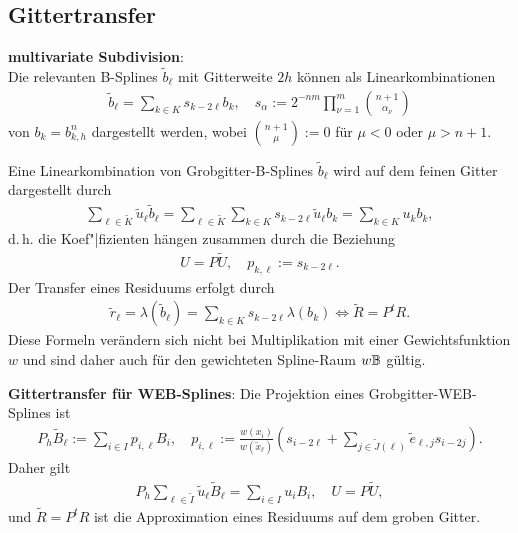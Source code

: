 \pagebreak

\subsection{%
    Gittertransfer%
}

\textbf{multivariate Subdivision}:\\
Die relevanten B-Splines $\widetilde{b}_\ell$ mit Gitterweite $2h$ können als Linearkombinationen
\begin{align*}
    \widetilde{b}_\ell = \sum_{k \in K} s_{k-2\ell} b_k,\quad
    s_\alpha := 2^{-nm} \prod_{\nu=1}^m \binom{n+1}{\alpha_\nu}
\end{align*}
von $b_k = b_{k,h}^n$ dargestellt werden,
wobei $\binom{n+1}{\mu} := 0$ für $\mu < 0$ oder $\mu > n + 1$.

Eine Linearkombination von Grobgitter-B-Splines $\widetilde{b}_\ell$ wird auf dem feinen Gitter
dargestellt durch
\begin{align*}
    \sum_{\ell \in \widetilde{K}} \widetilde{u}_\ell \widetilde{b}_\ell
    = \sum_{\ell \in \widetilde{K}} \sum_{k \in K} s_{k-2\ell} \widetilde{u}_\ell b_k
    = \sum_{k \in K} u_k b_k,
\end{align*}
d.\,h. die Koef"|fizienten hängen zusammen durch die Beziehung
\begin{align*}
    U = P \widetilde{U},\quad
    p_{k,\ell} := s_{k-2\ell}.
\end{align*}
Der Transfer eines Residuums erfolgt durch
\begin{align*}
    \widetilde{r}_\ell
    = \lambda(\widetilde{b}_\ell)
    = \sum_{k \in K} s_{k-2\ell} \lambda(b_k)
    \iff
    \widetilde{R} = P^t R.
\end{align*}
Diese Formeln verändern sich nicht bei Multiplikation mit einer Gewichtsfunktion $w$ und sind
daher auch für den gewichteten Spline-Raum $w\mathbb{B}$ gültig.

\linie

\textbf{Gittertransfer für WEB-Splines}:
Die Projektion eines Grobgitter-WEB-Splines ist
\begin{align*}
    P_h \widetilde{B}_\ell
    := \sum_{i \in I} p_{i,\ell} B_i,\quad
    p_{i,\ell} := \frac{w(x_i)}{w(\widetilde{x}_\ell)}
    \left(s_{i-2\ell} + \sum_{j \in \widetilde{J}(\ell)} \widetilde{e}_{\ell,j} s_{i-2j}\right).
\end{align*}
Daher gilt
\begin{align*}
    P_h \sum_{\ell \in \widetilde{I}} \widetilde{u}_\ell \widetilde{B}_\ell
    = \sum_{i \in I} u_i B_i,\quad
    U = P \widetilde{U},
\end{align*}
und $\widetilde{R} = P^t R$ ist die Approximation eines Residuums auf dem groben Gitter.

